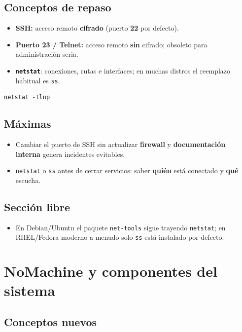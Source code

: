 \documentclass[11pt, letterpaper]{article}
\begin{document}
\subsection{Conceptos de repaso}
\label{sec:orgf1ad792}

\begin{itemize}
\item \textbf{SSH:} acceso remoto \textbf{cifrado} (puerto \textbf{22} por defecto).
\item \textbf{Puerto 23 / Telnet:} acceso remoto \textbf{sin} cifrado; obsoleto para administración seria.
\item \textbf{\texttt{netstat}}: conexiones, rutas e interfaces; en muchas distros el reemplazo habitual es \texttt{ss}.
\end{itemize}

\begin{verbatim}
netstat -tlnp
\end{verbatim}
\subsection{Máximas}
\label{sec:org17c840b}

\begin{itemize}
\item Cambiar el puerto de SSH sin actualizar \textbf{firewall} y \textbf{documentación interna} genera incidentes evitables.
\item \texttt{netstat} o \texttt{ss} antes de cerrar servicios: saber \textbf{quién} está conectado y \textbf{qué} escucha.
\end{itemize}
\subsection{Sección libre}
\label{sec:org854b3f9}

\begin{itemize}
\item En Debian/Ubuntu el paquete \texttt{net-tools} sigue trayendo \texttt{netstat}; en RHEL/Fedora moderno a menudo solo \texttt{ss} está instalado por defecto.
\end{itemize}
\section{NoMachine y componentes del sistema}
\label{sec:org587ff46}

\subsection{Conceptos nuevos}
\label{sec:org98b24d1}
\end{document}
